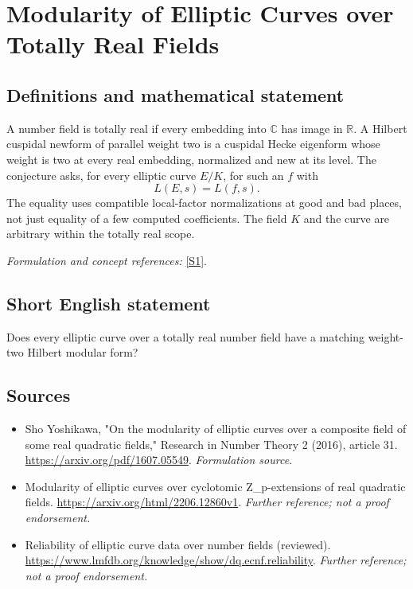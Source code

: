 \documentclass[11pt]{article}
\begin{document}
\section*{\texorpdfstring{Modularity of Elliptic Curves over Totally Real Fields}{Modularity of Elliptic Curves over Totally Real Fields}}\label{statement}
\subsection{Definitions and mathematical statement}
A number field is totally real if every embedding into ${\mathbb{C}}$ has image in ${\mathbb{R}}$. A Hilbert cuspidal newform of parallel weight two is a cuspidal Hecke eigenform whose weight is two at every real embedding, normalized and new at its level. The conjecture asks, for every elliptic curve $E/K$, for such an $f$ with
\[
 L(E,s)=L(f,s).
\]
The equality uses compatible local-factor normalizations at good and bad places, not just equality of a few computed coefficients. The field $K$ and the curve are arbitrary within the totally real scope.
\par\smallskip\textit{Formulation and concept references:} \href{https://arxiv.org/pdf/1607.05549}{[S1]}.

\subsection{Short English statement}
Does every elliptic curve over a totally real number field have a matching weight-two Hilbert modular form?
\subsection{Sources}
\begin{itemize}
\item[S1]Sho Yoshikawa, "On the modularity of elliptic curves over a composite field of some real quadratic fields," Research in Number Theory 2 (2016), article 31.
\url{https://arxiv.org/pdf/1607.05549}.
\textit{Formulation source.}
\item[S2]Modularity of elliptic curves over cyclotomic Z\_p-extensions of real quadratic fields.
\url{https://arxiv.org/html/2206.12860v1}.
\textit{Further reference; not a proof endorsement.}
\item[S3]Reliability of elliptic curve data over number fields (reviewed).
\url{https://www.lmfdb.org/knowledge/show/dq.ecnf.reliability}.
\textit{Further reference; not a proof endorsement.}
\end{itemize}
\end{document}
